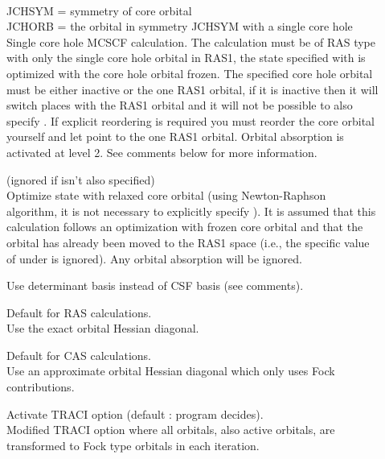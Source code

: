 \begin{description}
\item[]
   \\
  JCHSYM = symmetry of core orbital\\
  JCHORB = the orbital in symmetry JCHSYM with a single core hole\\
  Single core hole MCSCF calculation. The calculation must be of RAS type
  with only the single core hole orbital in RAS1, the state specified with
   is optimized with the core hole orbital
  frozen. 
  The specified core hole orbital must be either inactive or
  the one RAS1 orbital, if it is inactive then it will switch places with
  the RAS1 orbital and it will not be possible to also
  specify . If explicit reordering is required you must reorder
  the core orbital yourself and let  point to the one RAS1 orbital.
  Orbital absorption is activated at level 2. See comments below for more information.
 
\item[]
  (ignored if  isn't also specified)\\
  Optimize state with relaxed core orbital (using Newton-Raphson algorithm, 
  it is not necessary to explicitly specify ).
  It is assumed that this calculation follows an optimization
  with frozen core orbital and that the orbital has already been
  moved to the RAS1 space (i.e., the specific value of
   under  is ignored). Any
  orbital absorption   will be ignored.
 
\item[]
  Use determinant basis instead of CSF basis (see comments).

\item[]
  Default for RAS calculations.\\
  Use the exact orbital Hessian diagonal.
 
\item[]
  Default for CAS calculations.\\
  Use an approximate orbital Hessian diagonal which only uses Fock
  contributions.
 
\item[]
  Activate TRACI option (default : program decides).\\
  Modified TRACI option where all orbitals, also active orbitals, are
  transformed to Fock type orbitals in each iteration.


\end{description}
